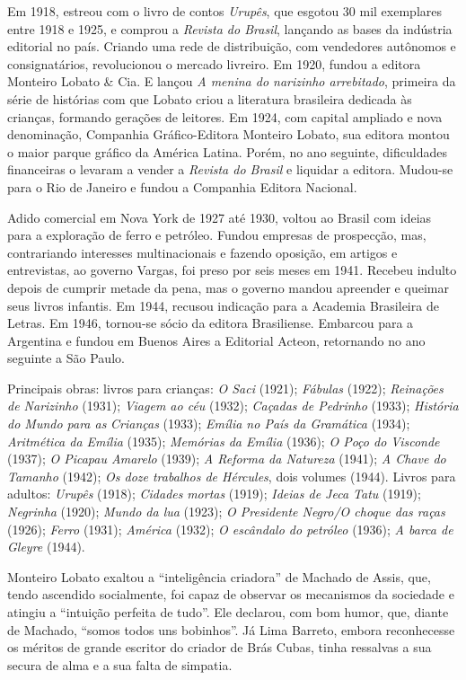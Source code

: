 Em 1918, estreou com o livro de contos \emph{Urupês}, que esgotou 30 mil
exemplares entre 1918 e 1925, e comprou a \emph{Revista do Brasil},
lançando as bases da indústria editorial no país. Criando uma rede de
distribuição, com vendedores autônomos e consignatários, revolucionou o
mercado livreiro. Em 1920, fundou a editora Monteiro Lobato \& Cia. E
lançou \emph{A menina do narizinho arrebitado}, primeira da série de
histórias com que Lobato criou a literatura brasileira dedicada às
crianças, formando gerações de leitores. Em 1924, com capital ampliado e
nova denominação, Companhia Gráfico-Editora Monteiro Lobato, sua editora
montou o maior parque gráfico da América Latina. Porém, no ano seguinte,
dificuldades financeiras o levaram a vender a \emph{Revista do Brasil} e
liquidar a editora. Mudou-se para o Rio de Janeiro e fundou a Companhia
Editora Nacional.

Adido comercial em Nova York de 1927 até 1930, voltou ao Brasil com
ideias para a exploração de ferro e petróleo. Fundou empresas de
prospecção, mas, contrariando interesses multinacionais e fazendo
oposição, em artigos e entrevistas, ao governo Vargas, foi preso por
seis meses em 1941. Recebeu indulto depois de cumprir metade da pena,
mas o governo mandou apreender e queimar seus livros infantis. Em 1944,
recusou indicação para a Academia Brasileira de Letras. Em 1946,
tornou-se sócio da editora Brasiliense. Embarcou para a Argentina e
fundou em Buenos Aires a Editorial Acteon, retornando no ano seguinte a
São Paulo.

Principais obras: livros para crianças: \emph{O Saci} (1921);
\emph{Fábulas} (1922); \emph{Reinações de Narizinho} (1931);
\emph{Viagem ao céu} (1932); \emph{Caçadas de Pedrinho} (1933);
\emph{História do Mundo para as} \emph{Crianças} (1933); \emph{Emília no
País da Gramática} (1934); \emph{Aritmética da Emília} (1935);
\emph{Memórias da Emília} (1936); \emph{O Poço do Visconde} (1937);
\emph{O Picapau Amarelo} (1939); \emph{A Reforma da Natureza} (1941);
\emph{A Chave do Tamanho} (1942); \emph{Os doze trabalhos de Hércules},
dois volumes (1944). Livros para adultos: \emph{Urupês} (1918);
\emph{Cidades} \emph{mortas} (1919); \emph{Ideias de Jeca Tatu} (1919);
\emph{Negrinha} (1920); \emph{Mundo da lua} (1923); \emph{O Presidente
Negro/O choque das raças} (1926); \emph{Ferro} (1931); \emph{América}
(1932); \emph{O escândalo do petróleo} (1936); \emph{A barca de Gleyre}
(1944).

Monteiro Lobato exaltou a ``inteligência criadora'' de Machado de Assis,
que, tendo ascendido socialmente, foi capaz de observar os mecanismos da
sociedade e atingiu a ``intuição perfeita de tudo''. Ele declarou, com
bom humor, que, diante de Machado, ``somos todos uns bobinhos''. Já Lima
Barreto, embora reconhecesse os méritos de grande escritor do criador de
Brás Cubas, tinha ressalvas a sua secura de alma e a sua falta de
simpatia.


